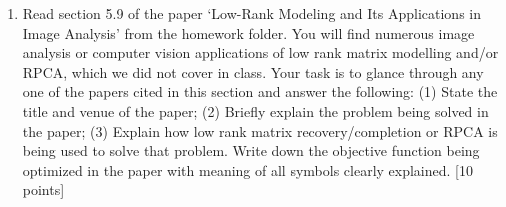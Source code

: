 \documentclass[11pt]{article}
\begin{document}
\begin{enumerate}
\item Read section 5.9 of the paper `Low-Rank Modeling and Its Applications in Image Analysis' from the homework folder. You will find numerous image analysis or computer vision applications of low rank matrix modelling and/or RPCA, which we did not cover in class. Your task is to glance through any one of the papers cited in this section and answer the following: (1) State the title and venue of the paper; (2) Briefly explain the problem being solved in the paper; (3) Explain how low rank matrix recovery/completion or RPCA is being used to solve that problem. Write down the objective function being optimized in the paper with meaning of all symbols clearly explained. \textsf{[10 points]}

\end{enumerate}
\end{document}
